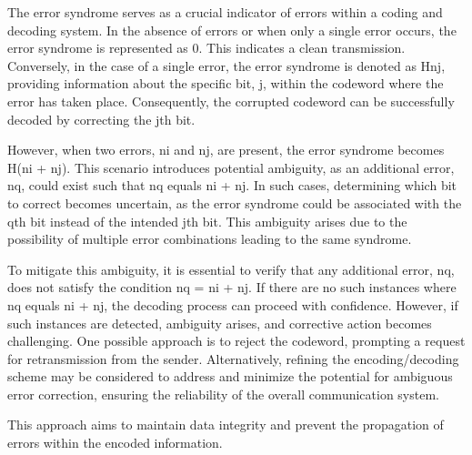 \documentclass[12pt]{report}
\begin{document}
	\begin{minipage}{1 \textwidth}
		
		The error syndrome serves as a crucial indicator of errors within a coding and decoding system. In the absence of errors or when only a single error occurs, the error syndrome is represented as 0. This indicates a clean transmission. Conversely, in the case of a single error, the error syndrome is denoted as Hnj, providing information about the specific bit, j, within the codeword where the error has taken place. Consequently, the corrupted codeword can be successfully decoded by correcting the jth bit. \newline
		
		However, when two errors, ni and nj, are present, the error syndrome becomes H(ni + nj). This scenario introduces potential ambiguity, as an additional error, nq, could exist such that nq equals ni + nj. In such cases, determining which bit to correct becomes uncertain, as the error syndrome could be associated with the qth bit instead of the intended jth bit. This ambiguity arises due to the possibility of multiple error combinations leading to the same syndrome. \newline
		
		To mitigate this ambiguity, it is essential to verify that any additional error, nq, does not satisfy the condition nq = ni + nj. If there are no such instances where nq equals ni + nj, the decoding process can proceed with confidence. However, if such instances are detected, ambiguity arises, and corrective action becomes challenging. One possible approach is to reject the codeword, prompting a request for retransmission from the sender. Alternatively, refining the encoding/decoding scheme may be considered to address and minimize the potential for ambiguous error correction, ensuring the reliability of the overall communication system. \newline
		
		This approach aims to maintain data integrity and prevent the propagation of errors within the encoded information. \newline
		
	\end{minipage}
	
	
	
\end{document}
